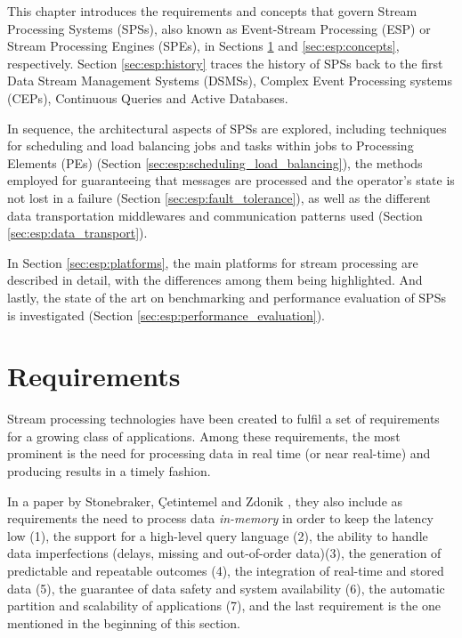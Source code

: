 \documentclass[ppgc,diss,english]{iiufrgs}
\begin{document}
This chapter introduces the requirements and concepts that govern Stream Processing Systems (SPSs), also known as Event-Stream Processing (ESP) or Stream Processing Engines (SPEs), in Sections \ref{sec:esp:requirements} and \ref{sec:esp:concepts}, respectively. Section \ref{sec:esp:history} traces the history of SPSs back to the first Data Stream Management Systems (DSMSs), Complex Event Processing systems (CEPs), Continuous Queries and Active Databases.

In sequence, the architectural aspects of SPSs are explored, including techniques for scheduling and load balancing jobs and tasks within jobs to Processing Elements (PEs) (Section \ref{sec:esp:scheduling_load_balancing}), the methods employed for guaranteeing that messages are processed and the operator's state is not lost in a failure (Section \ref{sec:esp:fault_tolerance}), as well as the different data transportation middlewares and communication patterns used (Section \ref{sec:esp:data_transport}).

In Section \ref{sec:esp:platforms}, the main platforms for stream processing are described in detail, with the differences among them being highlighted. And lastly, the state of the art on benchmarking and performance evaluation of SPSs is investigated (Section \ref{sec:esp:performance_evaluation}).

\section{Requirements}
\label{sec:esp:requirements}

Stream processing technologies have been created to fulfil a set of requirements for a growing class of applications. Among these requirements, the most prominent is the need for processing data in real time (or near real-time) and producing results in a timely fashion.

In a paper by Stonebraker, {\c{C}}etintemel and Zdonik \cite{stonebraker20058}, they also include as requirements the need to process data \emph{in-memory} in order to keep the latency low (1), the support for a high-level query language (2), the ability to handle data imperfections (delays, missing and out-of-order data)(3), the generation of predictable and repeatable outcomes (4), the integration of real-time and stored data (5), the guarantee of data safety and system availability (6), the automatic partition and scalability of applications (7), and the last requirement is the one mentioned in the beginning of this section.
\end{document}
